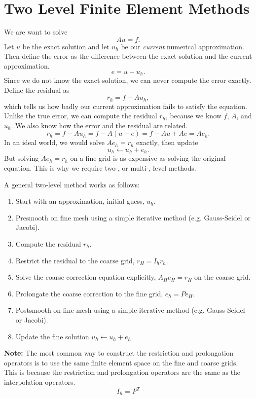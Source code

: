 \documentclass[../main.tex]{subfiles}
\begin{document}
\section{Two Level Finite Element Methods}

We are want to solve 
$$  
Au = f.
$$
Let $u$ be the exact solution and let $u_h$ be our \textit{current} numerical approximation. Then define the error 
as the difference between the exact solution and the current approximation.
$$
e = u - u_h.
$$
Since we do not know the exact solution, we can never compute the error exactly. Define the residual as
$$
r_h = f - Au_h,
$$
which tells us how badly our current approximation fails to satisfy the equation. Unlike the true error, we can compute the residual $r_h$, because we know $f$, $A$, and $u_h$. We also know how the error and the residual are related.
$$
r_h = f - Au_h = f - A(u - e) = f - Au + Ae = Ae_h.
$$
In an ideal world, we would solve $Ae_h = r_h$ exactly, then update 
$$
u_h \leftarrow u_h + e_h.
$$
But solving $Ae_h = r_h$ on a fine grid is as expensive as solving the original equation. This is why we require two-, or multi-, level methods.

A general two-level method works as follows:
\begin{enumerate}
    \item Start with an approximation, initial guess, $u_h$.
    \item Presmooth on fine mesh using a simple iterative method (e.g. Gauss-Seidel or Jacobi).
    \item Compute the residual $r_h$.
    \item Restrict the residual to the coarse grid, $r_H = I_h r_h$. \\
    \item Solve the coarse correction equation explicitly, $A_H e_H = r_H$ on the coarse grid.
    \item Prolongate the coarse correction to the fine grid, $e_h = P e_H$. \\
    \item Postsmooth on fine mesh using a simple iterative method (e.g. Gauss-Seidel or Jacobi).
    \item Update the fine solution $u_h \leftarrow u_h + e_h$.
\end{enumerate}

\noindent \textbf{Note:} The most common way to construct the restriction and prolongation operators is to use the same finite element space on the fine and coarse grids. This is because the restriction and prolongation operators are the same as the interpolation operators.
$$
I_h = P^T
$$
\end{document}
